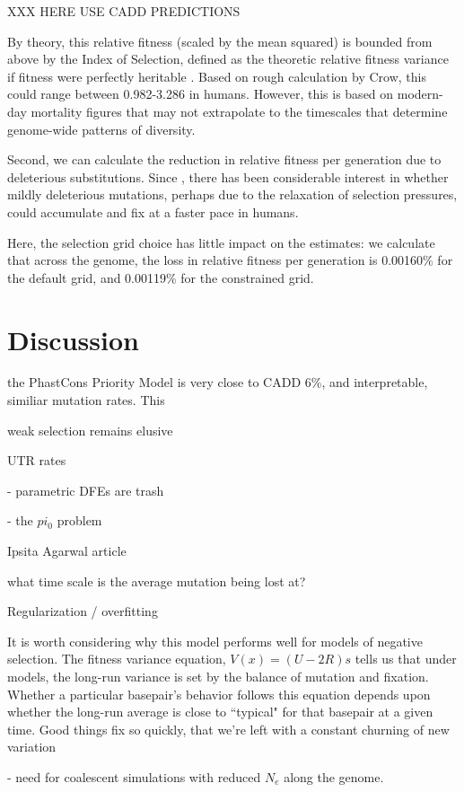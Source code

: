 \documentclass[11pt]{article}
\begin{document}
XXX HERE  USE CADD PREDICTIONS

By theory, this relative fitness (scaled by the mean squared) is
bounded from above by the Index of Selection, defined as the theoretic relative
fitness variance if fitness were perfectly heritable \parencite{Crow1958-pc}.
Based on rough calculation by Crow, this could range between 0.982-3.286 in
humans. However, this is based on modern-day mortality figures that may not
extrapolate to the timescales that determine genome-wide patterns of diversity. 

Second, we can calculate the reduction in relative fitness per generation due
to deleterious substitutions. Since \textcite{Muller1950-ta}, there has been
considerable interest in whether mildly deleterious mutations, perhaps due to
the relaxation of selection pressures, could accumulate and fix at a faster
pace in humans.

Here, the selection grid choice has little impact
on the estimates: we calculate that across the genome, the loss in relative
fitness per generation is 0.00160\% for the default grid, and 0.00119\% for the
constrained grid.


\section*{Discussion}

the PhastCons Priority Model is very close to CADD 6\%, and interpretable,
similiar mutation rates. This 

weak selection remains elusive

UTR rates 

- parametric DFEs are trash

- the $pi_0$ problem

Ipsita Agarwal article 

what time scale is the average mutation being lost at?

Regularization / overfitting 

It is worth considering why this model performs well for models of negative
selection. The fitness variance equation, $V(x) = (U-2R)s$ tells us that under
models, the long-run variance is set by the balance of mutation and fixation.
Whether a particular basepair's behavior follows this equation depends upon
whether the long-run average is close to ``typical" for that basepair at a
given time. Good things fix so quickly, that we're left with a constant
churning of new variation

- need for coalescent simulations with reduced $N_e$ along the genome.
\end{document}
